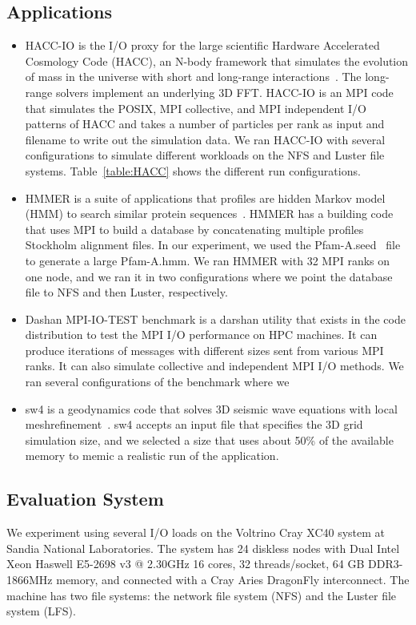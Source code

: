 \subsection{Applications}
\begin{itemize}
	\item HACC-IO is the I/O proxy for the large scientific Hardware Accelerated Cosmology Code (HACC), an N-body framework that simulates the evolution of mass in the universe with short and long-range interactions~\cite{habib2013hacc}. The long-range solvers implement an underlying 3D FFT. HACC-IO is an MPI code that simulates the POSIX, MPI collective, and MPI independent I/O patterns of HACC and takes a number of particles per rank as input and filename to write out the simulation data. We ran HACC-IO with several configurations to simulate different workloads on the NFS and Luster file systems. Table~\ref{table:HACC} shows the different run configurations. 
	\item HMMER is a suite of applications that profiles are hidden Markov model (HMM) to search similar protein sequences~\cite{eddy1992hmmer}. HMMER has a building code that uses MPI to build a database by concatenating multiple profiles Stockholm alignment files. In our experiment, we used the Pfam-A.seed~\cite{sonnhammer1998pfam} file to generate a large Pfam-A.hmm. We ran HMMER with 32 MPI ranks on one node, and we ran it in two configurations where we point the database file to NFS and then Luster, respectively. 
	\item Dashan MPI-IO-TEST benchmark is a darshan utility that exists in the code distribution to test the MPI I/O performance on HPC machines. It can produce iterations of messages with different sizes sent from various MPI ranks. It can also simulate collective and independent MPI I/O methods. We ran several configurations of the benchmark where we 
	\item sw4 is a geodynamics code that solves 3D seismic wave equations with local meshrefinement~\cite{peterssonsw4}. sw4 accepts an input file that specifies the 3D grid simulation size, and we selected a size that uses about 50\% of the available memory to memic a realistic run of the application.
\end{itemize}

\subsection{Evaluation System}
We experiment using several I/O loads on the Voltrino Cray XC40 system at Sandia National Laboratories. The system has 24  diskless nodes with Dual Intel Xeon Haswell E5-2698 v3 @ 2.30GHz 16 cores, 32 threads/socket, 64 GB DDR3-1866MHz memory, and connected with a Cray Aries DragonFly interconnect. The machine has two file systems: the network file system (NFS) and the Luster file system (LFS).

